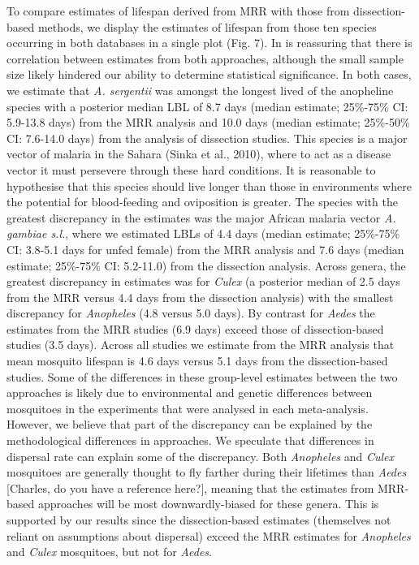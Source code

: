 \documentclass[]{article}
\begin{document}
To compare estimates of lifespan derived from MRR with those from
dissection-based methods, we display the estimates of lifespan from
those ten species occurring in both databases in a single plot (Fig. 7).
In is reassuring that there is correlation between estimates from both
approaches, although the small sample size likely hindered our ability
to determine statistical significance. In both cases, we estimate that
\emph{A. sergentii} was amongst the longest lived of the anopheline
species with a posterior median LBL of 8.7 days (median estimate;
25\%-75\% CI: 5.9-13.8 days) from the MRR analysis and 10.0 days (median
estimate; 25\%-50\% CI: 7.6-14.0 days) from the analysis of dissection
studies. This species is a major vector of malaria in the Sahara (Sinka
et al., 2010), where to act as a disease vector it must persevere
through these hard conditions. It is reasonable to hypothesise that this
species should live longer than those in environments where the
potential for blood-feeding and oviposition is greater. The species with
the greatest discrepancy in the estimates was the major African malaria
vector \emph{A. gambiae s.l.}, where we estimated LBLs of 4.4 days
(median estimate; 25\%-75\% CI: 3.8-5.1 days for unfed female) from the
MRR analysis and 7.6 days (median estimate; 25\%-75\% CI: 5.2-11.0) from
the dissection analysis. Across genera, the greatest discrepancy in
estimates was for \emph{Culex} (a posterior median of 2.5 days from the
MRR versus 4.4 days from the dissection analysis) with the smallest
discrepancy for \emph{Anopheles} (4.8 versus 5.0 days). By contrast for
\emph{Aedes} the estimates from the MRR studies (6.9 days) exceed those
of dissection-based studies (3.5 days). Across all studies we estimate
from the MRR analysis that mean mosquito lifespan is 4.6 days versus 5.1
days from the dissection-based studies. Some of the differences in these
group-level estimates between the two approaches is likely due to
environmental and genetic differences between mosquitoes in the
experiments that were analysed in each meta-analysis. However, we
believe that part of the discrepancy can be explained by the
methodological differences in approaches. We speculate that differences
in dispersal rate can explain some of the discrepancy. Both
\emph{Anopheles} and \emph{Culex} mosquitoes are generally thought to
fly farther during their lifetimes than \emph{Aedes} {[}Charles, do you
have a reference here?{]}, meaning that the estimates from MRR-based
approaches will be most downwardly-biased for these genera. This is
supported by our results since the dissection-based estimates
(themselves not reliant on assumptions about dispersal) exceed the MRR
estimates for \emph{Anopheles} and \emph{Culex} mosquitoes, but not for
\emph{Aedes}.
\end{document}
